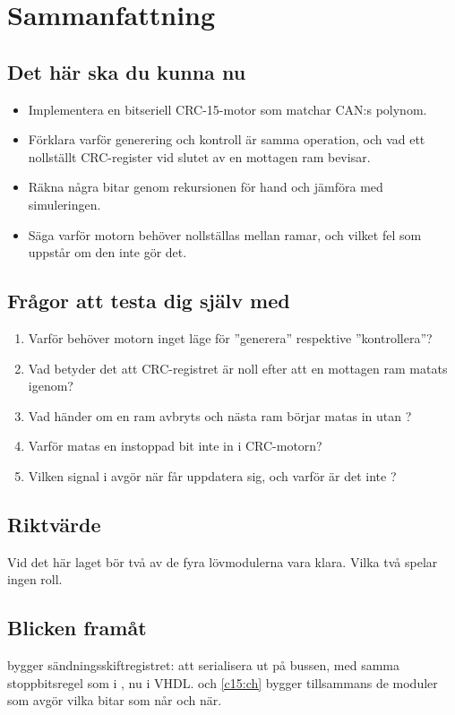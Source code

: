 
\section{Sammanfattning}
\label{c13:sec:review}

\subsection*{Det här ska du kunna nu}
\begin{itemize}
  \item Implementera en bitseriell CRC-15-motor som matchar CAN:s polynom.
  \item Förklara varför generering och kontroll är samma operation, och vad ett nollställt
    CRC-register vid slutet av en mottagen ram bevisar.
  \item Räkna några bitar genom rekursionen för hand och jämföra med simuleringen.
  \item Säga varför motorn behöver nollställas mellan ramar, och vilket fel som uppstår om den inte
    gör det.
\end{itemize}

\subsection*{Frågor att testa dig själv med}
\begin{enumerate}
  \item Varför behöver motorn inget läge för ”generera” respektive ”kontrollera”?
  \item Vad betyder det att CRC-registret är noll efter att en mottagen ram matats igenom?
  \item Vad händer om en ram avbryts och nästa ram börjar matas in utan ?
  \item Varför matas en instoppad bit inte in i CRC-motorn?
  \item Vilken signal i  avgör när  får uppdatera sig, och varför
    är det inte ?
\end{enumerate}

\subsection*{Riktvärde}
Vid det här laget bör två av de fyra lövmodulerna vara klara. Vilka två spelar ingen roll.

\subsection*{Blicken framåt}
 bygger sändningsskiftregistret: att serialisera ut på bussen, med samma
stoppbitsregel som i , nu i VHDL.  och \ref{c15:ch} bygger
tillsammans de moduler som avgör vilka bitar som når  och när.
